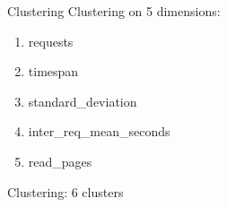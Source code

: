 \begin{frame}{Clustering}
    Clustering on 5 dimensions:
    \begin{enumerate}
        \item requests
        \item timespan
        \item standard\_deviation
        \item inter\_req\_mean\_seconds
        \item read\_pages
    \end{enumerate}
\end{frame}

\begin{frame}{Clustering: 6 clusters}
    \begin{center}
\end{center}
\end{frame}
